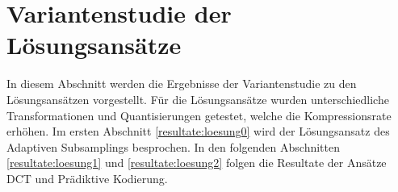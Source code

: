 \section{Variantenstudie der Lösungsansätze}\label{resultate}
In diesem Abschnitt werden die Ergebnisse der Variantenstudie zu den Lösungsansätzen vorgestellt. Für die Lösungsansätze wurden unterschiedliche Transformationen und Quantisierungen getestet, welche die Kompressionsrate erhöhen. Im ersten Abschnitt \ref{resultate:loesung0} wird der Lösungsansatz des Adaptiven Subsamplings besprochen. In den folgenden Abschnitten \ref{resultate:loesung1} und \ref{resultate:loesung2} folgen die Resultate der Ansätze DCT und Prädiktive Kodierung.


\pagebreak

\pagebreak

